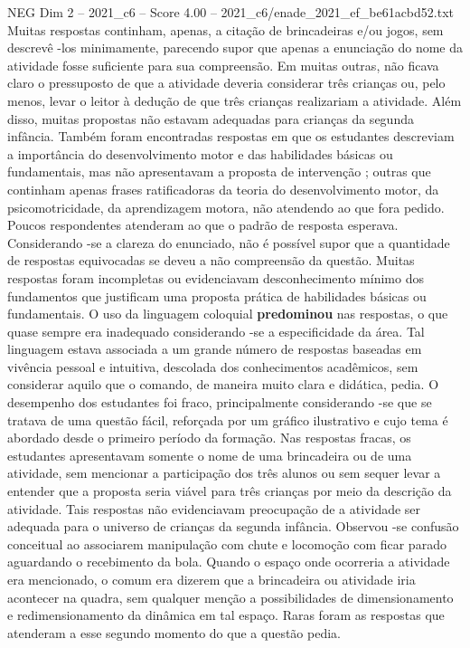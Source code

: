 \begin{textsample}{NEG Dim 2 – 2021\_c6 – Score 4.00 – 2021\_c6/enade\_2021\_ef\_be61acbd52.txt}
Muitas respostas continham, apenas, a citação de brincadeiras e/ou jogos, sem descrevê -los minimamente, parecendo supor que apenas a enunciação do nome da atividade fosse suficiente para sua compreensão.
Em muitas outras, não ficava claro o pressuposto de que a atividade deveria considerar três crianças ou, pelo menos, levar o leitor à dedução de que três crianças realizariam a atividade.
Além disso, muitas propostas não estavam adequadas para crianças da segunda infância.
Também foram encontradas respostas em que os estudantes descreviam a importância do desenvolvimento motor e das habilidades básicas ou fundamentais, mas não apresentavam a proposta de intervenção ; outras que continham apenas frases ratificadoras da teoria do desenvolvimento motor, da psicomotricidade, da aprendizagem motora, não atendendo ao que fora pedido.
Poucos respondentes atenderam ao que o padrão de resposta esperava.
Considerando -se a clareza do enunciado, não é possível supor que a quantidade de respostas equivocadas se deveu a não compreensão da questão.
Muitas respostas foram incompletas ou evidenciavam desconhecimento mínimo dos fundamentos que justificam uma proposta prática de habilidades básicas ou fundamentais.
O uso da linguagem coloquial \textbf{predominou} nas respostas, o que quase sempre era inadequado considerando -se a especificidade da área.
Tal linguagem estava associada a um grande número de respostas baseadas em vivência pessoal e intuitiva, descolada dos conhecimentos acadêmicos, sem considerar aquilo que o comando, de maneira muito clara e didática, pedia.
O desempenho dos estudantes foi fraco, principalmente considerando -se que se tratava de uma questão fácil, reforçada por um gráfico ilustrativo e cujo tema é abordado desde o primeiro período da formação.
Nas respostas fracas, os estudantes apresentavam somente o nome de uma brincadeira ou de uma atividade, sem mencionar a participação dos três alunos ou sem sequer levar a entender que a proposta seria viável para três crianças por meio da descrição da atividade.
Tais respostas não evidenciavam preocupação de a atividade ser adequada para o universo de crianças da segunda infância.
Observou -se confusão conceitual ao associarem manipulação com chute e locomoção com ficar parado aguardando o recebimento da bola.
Quando o espaço onde ocorreria a atividade era mencionado, o comum era dizerem que a brincadeira ou atividade iria acontecer na quadra, sem qualquer menção a possibilidades de dimensionamento e redimensionamento da dinâmica em tal espaço.
Raras foram as respostas que atenderam a esse segundo momento do que a questão pedia.

\end{textsample}
